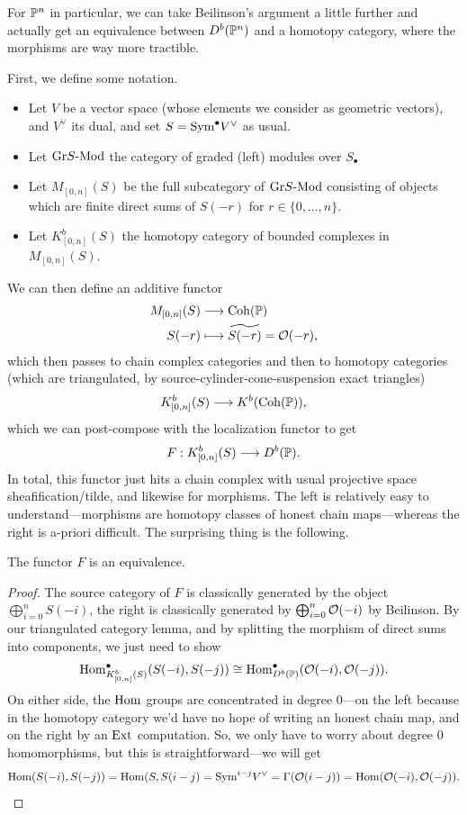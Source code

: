 \documentclass[12pt]{article}
\begin{document}
For $\P^n$ in particular, we can take Beilinson's argument a little further and actually get an equivalence between $D^b(\P^n)$ and a homotopy category, where the morphisms are way more tractible.

First, we define some notation.
\begin{itemize}
    \item Let $V$ be a vector space (whose elements we consider as geometric vectors), and $V^\vee$ its dual, and set $S= \Sym^\bullet V^\vee$ as usual.
    \item Let $\grlMod{S}$ the category of graded (left) modules over $S_\bullet$
    \item Let $M_{[0,n]}(S)$ be the full subcategory of $\grlMod{S}$ consisting of objects which are finite direct sums of $S(-r)$ for $r\in \{0,\dots,n\}$.
    \item Let $K^b_{[0,n]}(S)$ the homotopy category of bounded complexes in $M_{[0,n]}(S)$.
\end{itemize}

We can then define an additive functor
\begin{align*}
    M_{[0,n]}(S) &\longrightarrow \Coh(\P)\\
    S(-r) &\longmapsto \tilde{S(-r)}=\cO(-r),
\end{align*}
which then passes to chain complex categories and then to homotopy categories (which are triangulated, by source-cylinder-cone-suspension exact triangles)
\[K^b_{[0,n]}(S) \longrightarrow K^b(\Coh(\P)),\]
which we can post-compose with the localization functor to get
\[F: K^b_{[0,n]}(S) \longrightarrow D^b(\P).\]
In total, this functor just hits a chain complex with usual projective space sheafification/tilde, and likewise for morphisms. The left is relatively easy to understand---morphisms are homotopy classes of honest chain maps---whereas the right is a-priori difficult. The surprising thing is the following.

\begin{thm}
    The functor $F$ is an equivalence.
\end{thm}
\begin{proof}
    The source category of $F$ is classically generated by the object $\bigoplus_{i=0}^n S(-i)$, the right is classically generated by $\bigoplus_{i=0}^n \cO(-i)$ by Beilinson. By our triangulated category lemma, and by splitting the morphism of direct sums into components, we just need to show
    \[\Hom_{K^b_{[0,n]}(S)}^\bullet(S(-i),S(-j)) \cong \Hom_{D^b(\P)}^\bullet(\cO(-i),\cO(-j)).\]
    On either side, the $\Hom$ groups are concentrated in degree 0---on the left because in the homotopy category we'd have no hope of writing an honest chain map, and on the right by an $\Ext$ computation. So, we only have to worry about degree 0 homomorphisms, but this is straightforward---we will get
    \[\Hom(S(-i),S(-j)) = \Hom(S,S(i-j) = \Sym^{i-j} V^\vee = \Gamma(\cO(i-j)) = \Hom(\cO(-i),\cO(-j)).\]
\end{proof}
\end{document}
